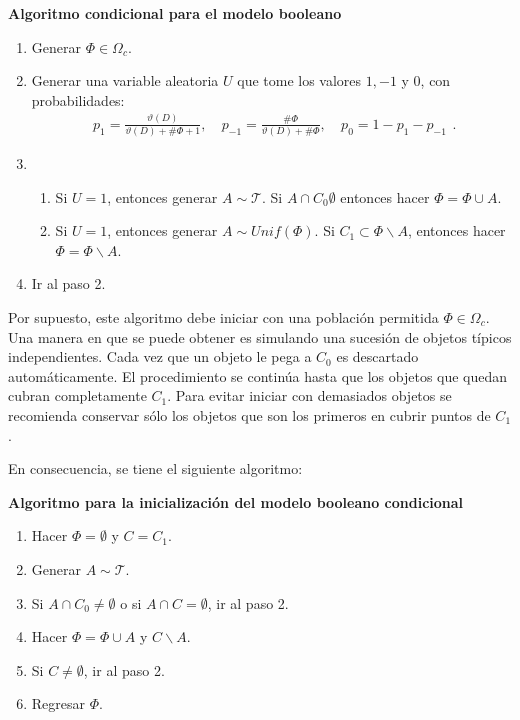 \textbf{Algoritmo condicional para el modelo booleano}

\begin{enumerate}
\item Generar $\Phi\in\Omega_c$.
\item Generar una variable aleatoria $U$ que tome los valores $1,-1$ y $0$, con probabilidades:
    \[\begin{array}{lcr}p_{1}=\frac{\vartheta(D)}{\vartheta(D)+\#\Phi+1},&\ p_{-1}=\frac{\#\Phi}{\vartheta(D)+\#\Phi},&\ p_0=1-p_1-p_{-1}\end{array}.\]
\item \begin{enumerate}
\item Si $U=1$, entonces generar $A\sim\mathcal{T}$. Si $A\cap C_0\emptyset$ entonces hacer $\Phi=\Phi\cup A$.
\item Si $U=1$, entonces generar $A\sim Unif(\Phi)$. Si $C_1\subset\Phi\backslash A$, entonces hacer $\Phi=\Phi\backslash A$.
\end{enumerate}
\item Ir al paso 2.
\end{enumerate}

Por supuesto, este algoritmo debe iniciar con una poblaci\'on permitida $\Phi\in\Omega_c$. Una manera en que se puede obtener es simulando una sucesi\'on de objetos t\'ipicos independientes. Cada vez que un objeto le pega a $C_0$ es descartado autom\'aticamente. El procedimiento se contin\'ua hasta que los objetos que quedan cubran completamente $C_1$. Para evitar iniciar con demasiados objetos se recomienda conservar s\'olo los objetos que son los primeros en cubrir puntos de $C_1$. 


En consecuencia, se tiene el siguiente algoritmo:

\textbf{Algoritmo para la inicializaci\'on del modelo booleano condicional}

\begin{enumerate}
\item Hacer $\Phi=\emptyset$ y $C=C_1$.
\item Generar $A\sim\mathcal{T}$.
\item Si $A\cap C_0\neq\emptyset$ o si $A\cap C=\emptyset$, ir al paso 2.
\item Hacer $\Phi=\Phi\cup A$ y $C\backslash A$.
\item Si $C\neq\emptyset$, ir al paso 2.
\item Regresar $\Phi$.
\end{enumerate}

